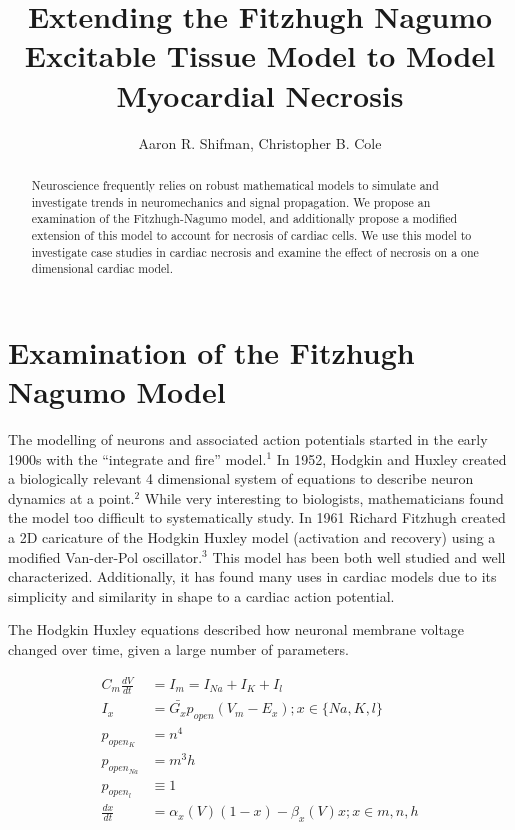 \documentclass[11pt]{article}
\begin{document}
\title{Extending the Fitzhugh Nagumo Excitable Tissue Model to Model Myocardial Necrosis}
\author{Aaron R. Shifman, Christopher B. Cole}
\maketitle
\tableofcontents

\begin{abstract}

Neuroscience frequently relies on robust mathematical models to simulate and investigate trends in neuromechanics and signal propagation. We propose an examination of the Fitzhugh-Nagumo model, and additionally propose a modified extension of this model to account for necrosis of cardiac cells. We use this model to investigate case studies in cardiac necrosis and examine the effect of necrosis on a one dimensional cardiac model. 
\end{abstract}

\section{Examination of the Fitzhugh Nagumo Model}

The modelling of neurons and associated action potentials started in the early 1900s with the ``integrate and fire'' model.$^1$ In 1952, Hodgkin and Huxley created a biologically relevant 4 dimensional system of equations to describe neuron dynamics at a point.$^2$ While very interesting to biologists, mathematicians found the model too difficult to systematically study. In 1961 Richard Fitzhugh created a 2D caricature of the Hodgkin Huxley model (activation and recovery) using a modified Van-der-Pol oscillator.$^3$ This model has been both well studied and well characterized. Additionally, it has found many uses in cardiac models due to its simplicity and similarity in shape to a cardiac action potential. 

The Hodgkin Huxley equations described how neuronal membrane voltage changed over time, given a large number of parameters. 

\begin{align}
C_m \frac{dV}{dt} &= I_m = I_{Na} + I_{K} + I_l \\
I_x &= \bar{G_x}p_{open}(V_m-E_x); x\in\{Na,K,l\}\\
p_{open_{K}} &= n^4\\
p_{open_{Na}} &= m^3h\\
p_{open_{l}} &\equiv 1\\
\frac{dx}{dt} &= \alpha_x(V)(1-x)-\beta_x(V)x; x\in{m,n,h}\\
\end{align}
\end{document}
